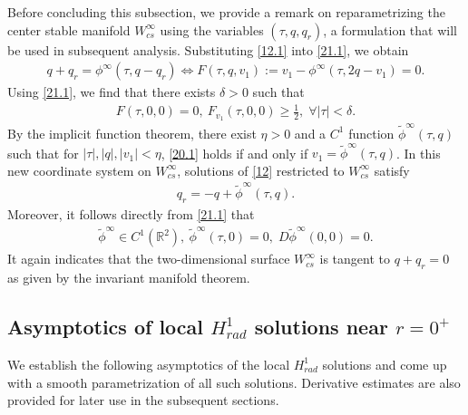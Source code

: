 \documentclass[12pt]{amsart}
\newcommand{\R}{\mathbb R}
\begin{document}
Before concluding this subsection, we provide a remark on reparametrizing the center stable manifold $W_{cs}^\infty$ using the variables $(\tau, q, q_r)$, a formulation that will be used in subsequent analysis. Substituting  \eqref{12.1} into \eqref{21.1}, we obtain
\begin{align}\label{20.1}
q+q_r=\phi^{\infty}(\tau, q-q_r) \Longleftrightarrow 
F(\tau, q, v_1):=v_1-\phi^{\infty}(\tau, 2q-v_1)=0.
\end{align}
Using \eqref{21.1}, we find that there exists $\delta>0$ such that 
\begin{align*}
F(\tau,0,0)=0,\ F_{v_1}(\tau, 0, 0)\ge \tfrac 12, \; \forall |\tau| <\delta. 
\end{align*}
By the implicit function theorem, there exist $\eta>0$ and a $C^1$ function $\tilde \phi^\infty(\tau,q)$ such that for $|\tau|, |q|, |v_1|<\eta$, \eqref{20.1} holds if and only if $
v_1 =\tilde\phi ^\infty(\tau,q)$. In this new coordinate system on $W^{\infty}_{cs}$, solutions of \eqref{12} restricted to $W^{\infty}_{cs} $ satisfy  
\begin{align}\label{20.3}
q_r=-q+\tilde \phi^\infty(\tau, q).
\end{align}
 Moreover, it follows directly from \eqref{21.1} that
  \begin{align}\label{20.4}
 \tilde \phi^\infty \in C^1(\R^2), \ \tilde \phi^\infty(\tau,0)=0, \; D \tilde \phi^\infty(0,0)=0. 
 \end{align}
It again indicates that the two-dimensional surface $W^{\infty}_{cs}$ is tangent to $q+q_r=0$ as given by the invariant manifold theorem. 


\subsection{Asymptotics of local $H_{rad}^1$ solutions near $r=0^+$}

We establish the following asymptotics of the local $H_{rad}^1$ solutions and come up with a smooth parametrization of 
all such solutions. Derivative estimates are also provided for later use in the subsequent sections. 
\end{document}
